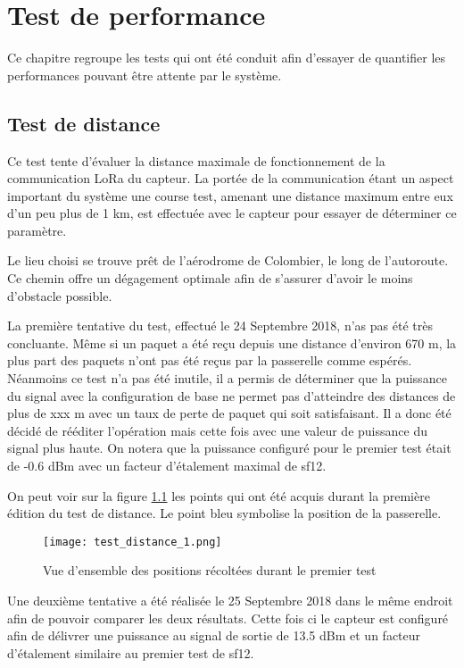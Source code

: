 
\chapter{Test de performance}

Ce chapitre regroupe les tests qui ont été conduit afin d'essayer de quantifier les performances pouvant être attente par le système.

\section{Test de distance}\label{ch:test_distance}

Ce test tente d'évaluer la distance maximale de fonctionnement de la communication LoRa du capteur. La portée de la communication étant un aspect important du système une course test, amenant une distance maximum entre eux d'un peu plus de 1 km, est effectuée avec le capteur pour essayer de déterminer ce paramètre.

Le lieu choisi se trouve prêt de l'aérodrome de Colombier, le long de l'autoroute. Ce chemin offre un dégagement optimale afin de s'assurer d'avoir le moins d'obstacle possible.

La première tentative du test, effectué le 24 Septembre 2018, n'as pas été très concluante. Même si un paquet a été reçu depuis une distance d'environ 670 m, la plus part des paquets n'ont pas été reçus par la passerelle comme espérés. Néanmoins ce test n'a pas été inutile, il a permis de déterminer que la puissance du signal avec la configuration de base ne permet pas d'atteindre des distances de plus de xxx m avec un taux de perte de paquet qui soit satisfaisant. Il a donc été décidé de rééditer l'opération mais cette fois avec une valeur de puissance du signal plus haute. On notera que la puissance configuré pour le premier test était de -0.6 dBm avec un facteur d'étalement maximal de sf12.

On peut voir sur la figure \ref{fig:test_distance_11} les points qui ont été acquis durant la première édition du test de distance. Le point bleu symbolise la position de la passerelle.

\begin{figure}[htb]
\centering 
\texttt{[image: test\_distance\_1.png]} 
\caption{Vue d'ensemble des positions récoltées durant le premier test}
\label{fig:test_distance_11}
\end{figure}

Une deuxième tentative a été réalisée le 25 Septembre 2018 dans le même endroit afin de pouvoir comparer les deux résultats. Cette fois ci le capteur est configuré afin de délivrer une puissance au signal de sortie de 13.5 dBm et un facteur d'étalement similaire au premier test de sf12.

